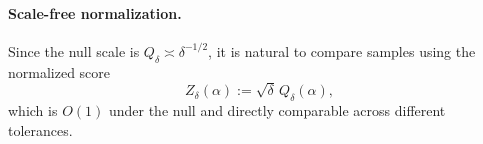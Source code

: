 \paragraph{Scale-free normalization.}
Since the null scale is $Q_\delta\asymp \delta^{-1/2}$, it is natural to compare samples using the normalized score
\begin{equation}
  Z_{\delta}(\alpha):=\sqrt{\delta}\,Q_\delta(\alpha),
\end{equation}
which is $O(1)$ under the null and directly comparable across different tolerances.


